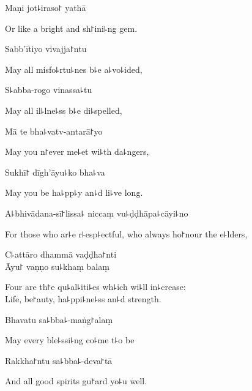 Maṇi jot꜕iraso꜓ yathā

\begin{english}
  Or like a bright and sh꜓ini꜕ng gem.
\end{english}

Sabb'ītiyo vivajja꜓ntu

\begin{english}
  May all misfo꜕rtu꜕nes b꜕e a꜕vo꜕ided,
\end{english}

S꜕abba-rogo vinassa꜕tu

\begin{english}
  May all il꜕lne꜕ss b꜕e di꜕spelled,
\end{english}

Mā te bha꜕vatv-antarā꜓yo

\begin{english}
  May you n꜓ever me꜕et wi꜕th da꜕ngers,
\end{english}

Sukhī꜓ dīgh'āyu꜕ko bha꜕va

\begin{english}
  May you be ha꜕pp꜕y an꜕d li꜕ve long.
\end{english}

A꜕bhivādana-sī꜓lissa꜕ niccaṃ vu꜕ḍḍhāpa꜕cāyi꜕no\\

\begin{english}
  For those who ar꜕e r꜕esp꜕ectful, who always ho꜓nour the e꜕lders,
\end{english}

C꜕attāro dhammā vaḍḍha꜓nti\\
Āyu꜓ vaṇṇo su꜕khaṃ balaṃ

\begin{english}
  Four are th꜓e qu꜕al꜕iti꜕es wh꜕ich wi꜕ll in꜕crease:\\
  Life, be꜓auty, ha꜕ppi꜕ne꜕ss an꜕d strength.
\end{english}

Bhavatu sa꜕bba꜕-maṅg꜓alaṃ

\begin{english}
  May every ble꜕ssi꜕ng co꜕me t꜕o be
\end{english}

Rakkha꜓ntu sa꜕bba꜕-deva꜓tā

\begin{english}
  And all good spirits gu꜓ard yo꜕u well.
\end{english}

